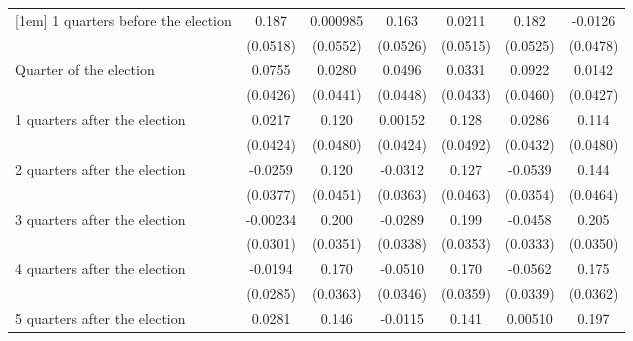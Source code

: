 \begin{table}[htbp]
\begin{tabular}{l*{6}{c}}
[1em]
 1 quarters before the election&       0.187\sym{***}&    0.000985         &       0.163\sym{**} &      0.0211         &       0.182\sym{***}&     -0.0126         \\
                    &    (0.0518)         &    (0.0552)         &    (0.0526)         &    (0.0515)         &    (0.0525)         &    (0.0478)         \\
[1em]
Quarter of the election&      0.0755         &      0.0280         &      0.0496         &      0.0331         &      0.0922\sym{*}  &      0.0142         \\
                    &    (0.0426)         &    (0.0441)         &    (0.0448)         &    (0.0433)         &    (0.0460)         &    (0.0427)         \\
[1em]
 1 quarters after the election&      0.0217         &       0.120\sym{*}  &     0.00152         &       0.128\sym{**} &      0.0286         &       0.114\sym{*}  \\
                    &    (0.0424)         &    (0.0480)         &    (0.0424)         &    (0.0492)         &    (0.0432)         &    (0.0480)         \\
[1em]
 2 quarters after the election&     -0.0259         &       0.120\sym{**} &     -0.0312         &       0.127\sym{**} &     -0.0539         &       0.144\sym{**} \\
                    &    (0.0377)         &    (0.0451)         &    (0.0363)         &    (0.0463)         &    (0.0354)         &    (0.0464)         \\
[1em]
 3 quarters after the election&    -0.00234         &       0.200\sym{***}&     -0.0289         &       0.199\sym{***}&     -0.0458         &       0.205\sym{***}\\
                    &    (0.0301)         &    (0.0351)         &    (0.0338)         &    (0.0353)         &    (0.0333)         &    (0.0350)         \\
[1em]
 4 quarters after the election&     -0.0194         &       0.170\sym{***}&     -0.0510         &       0.170\sym{***}&     -0.0562         &       0.175\sym{***}\\
                    &    (0.0285)         &    (0.0363)         &    (0.0346)         &    (0.0359)         &    (0.0339)         &    (0.0362)         \\
[1em]
 5 quarters after the election&      0.0281         &       0.146\sym{***}&     -0.0115         &       0.141\sym{***}&     0.00510         &       0.197\sym{***}\\

\end{tabular}
\end{table}
